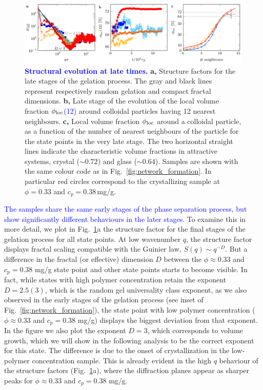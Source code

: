 \documentclass[preprint,amsmath,amssymb,superscriptaddress]{revtex4-1}
\begin{document}
\begin{figure}
 \includegraphics[width=16cm]{late_structure.pdf}
 \caption{\textcolor{blue}{{\bf Structural evolution at late times.}} 
{\bf a,} Structure factors for the late stages of the gelation process. The gray and black lines represent respectively random gelation and compact fractal dimensions.
{\bf b,} Late stage of the evolution of the local volume fraction \textcolor{blue}{$\phi_{\rm loc}$(12)} around colloidal particles having 12 nearest neighbours.
{\bf c,} Local volume fraction \textcolor{blue}{$\phi_{\rm loc}$} around a colloidal particle, as a function of the number of nearest neighbours of the particle for the state points in the very late stage. 
The two horizontal straight lines indicate the characteristic volume fractions in attractive systems, crystal ($\sim 0.72$) and glass ($\sim 0.64$).
Samples are shown with the same colour code as in Fig.~\ref{fig:network_formation}. In particular red circles correspond to the crystallizing sample at $\phi=0.33$ and $c_p=0.38\,$mg/g.
 }
 \label{fig:late_structure}
\end{figure}

\textcolor{blue}{The samples share the same early stages of the phase separation process, but show significantly different behaviours in the later stages.}
To examine this in more detail, we plot in Fig.~\ref{fig:late_structure}a the structure factor for the final stages of the gelation process for all state points.
At low wavenumber $q$, the structure factor displays fractal scaling compatible with the Guinier law, $S(q)\sim q^{-D}$.
But a difference in the fractal (or effective) dimension $D$ between the $\phi\approx 0.33$ and $c_p=0.38$ mg/g state point and other state points starts to become visible. In fact, while states
with high polymer concentration retain the exponent $D=2.5(3)$, 
which is the random gel universality class exponent, as we also observed in the early stages of the gelation process (see inset of Fig.~\ref{fig:network_formation}),
the state point with low polymer concentration ($\phi\approx 0.33$ and $c_p=0.38$ mg/g) displays the biggest deviation from that exponent. In the figure we also
plot the exponent $D=3$, which corresponds to volume growth, which we will show in the following analysis to be the correct exponent for this state. 
The difference is due to the onset of crystallization in the low-polymer concentration sample. This is already evident in the high $q$ behaviour of
the structure factors (Fig.~\ref{fig:late_structure}a), where the diffraction planes appear as sharper peaks for $\phi\approx 0.33$ and $c_p=0.38$ mg/g.
\end{document}
